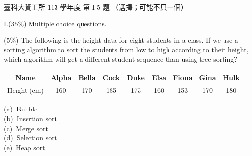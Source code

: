 \begin{pastexam}[label={px:ntust-113-ice-05}]{臺科大資工所 113 學年度 第 I-5 題}
（選擇；可能不只一個）

I.\quad \underline{(35\%) Multiple choice questions.}

(5\%) The following is the height data for eight students in a class. If we use a sorting algorithm
to sort the students from low to high according to their height, which algorithm will get a
different student sequence than using tree sorting?
\begin{center}
\begin{tabular}{|c|c|c|c|c|c|c|c|c|}
\hline
Name & Alpha & Bella & Cock & Duke & Elsa & Fiona & Gina & Hulk \\ \hline
Height (cm) & 160 & 170 & 185 & 173 & 160 & 153 & 170 & 180 \\ \hline
\end{tabular}
\end{center}
(a)~Bubble\\
(b)~Insertion sort\\
(c)~Merge sort\\
(d)~Selection sort\\
(e)~Heap sort
\end{pastexam}

